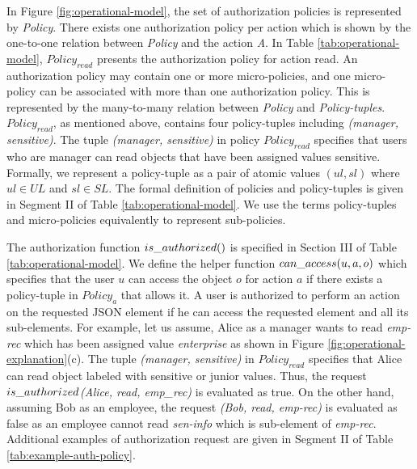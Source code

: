 In Figure \ref{fig:operational-model}, the set of authorization policies is represented by \textit{Policy}. There exists one authorization policy per action which is shown by the one-to-one relation between  \textit{Policy} and the action \textit{A}. In Table \ref{tab:operational-model}, $Policy_{read}$ presents the authorization policy for  action read. An authorization policy may contain one or more micro-policies, and one micro-policy can be associated with more than one authorization policy. This is represented by the many-to-many relation between \textit{Policy} and \textit{Policy-tuples}. $Policy_{read}$, as mentioned above, contains four policy-tuples including \textit{(manager, sensitive)}. The tuple \textit{(manager, sensitive)} in policy $Policy_{read}$ specifies that users who are manager can read objects that have been assigned values sensitive. Formally, we represent a policy-tuple as a pair of atomic values $(ul, sl)$ where $ul \in UL$ and $sl \in SL$. The formal definition of policies and policy-tuples is given in Segment II of Table \ref{tab:operational-model}. We use the terms policy-tuples and micro-policies equivalently to represent sub-policies.


The authorization function $is\_authorized{}()$ is specified in Section III of Table \ref{tab:operational-model}. We define the helper function $can\_access{}(u,a,o)$ which specifies that the user $u$ can access the object $o$ for action $a$ if there exists a policy-tuple in $Policy_{a}$ that allows it. A user is authorized to perform an action on the requested JSON element  if he can access the requested element and all its sub-elements. For example, let us assume, Alice as a manager wants to read \textit{emp-rec} which has been assigned value \textit{enterprise} as shown in Figure \ref{fig:operational-explanation}(c). The tuple \textit{(manager, sensitive)} in $Policy_{read}$ specifies that Alice can read object labeled with sensitive or junior values. Thus, the request $is\_authorized$\textit{(Alice, read, emp\_rec)} is evaluated as true. On the other hand, assuming Bob as an employee, the request \textit{\request(Bob, read, emp-rec)} is evaluated as false as an employee cannot read \textit{sen-info} which is sub-element of \textit{emp-rec}. Additional examples of authorization request are given in Segment II of Table  \ref{tab:example-auth-policy}.


